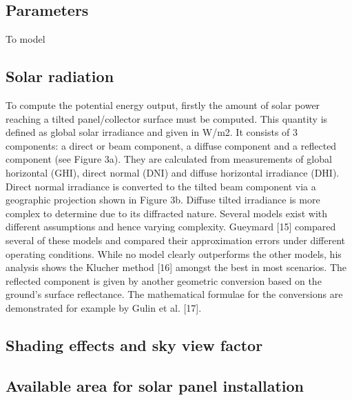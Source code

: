 \subsection{Parameters}

To model 

\subsection{Solar radiation}

To compute the potential energy output, firstly the amount of solar power reaching a tilted panel/collector surface must be computed. This quantity is defined as global solar irradiance and given in W/m2. It consists of 3 components: a direct or beam component, a diffuse component and a reflected component (see Figure 3a). They are calculated from measurements of global horizontal (GHI), direct normal (DNI) and diffuse horizontal irradiance (DHI). Direct normal irradiance is converted to the tilted beam component via a geographic projection shown in Figure 3b. Diffuse tilted irradiance is more complex to determine due to its diffracted nature. Several models exist with different assumptions and hence varying complexity. Gueymard [15] compared several of these models and compared their approximation errors under different operating conditions. While no model clearly outperforms the other models, his analysis shows the Klucher method [16] amongst the best in most scenarios. The reflected component is given by another geometric conversion based on the ground’s surface reflectance. The mathematical formulae for the conversions are demonstrated for example by Gulin et al. [17].


\subsection{Shading effects and sky view factor}

\subsection{Available area for solar panel installation}

